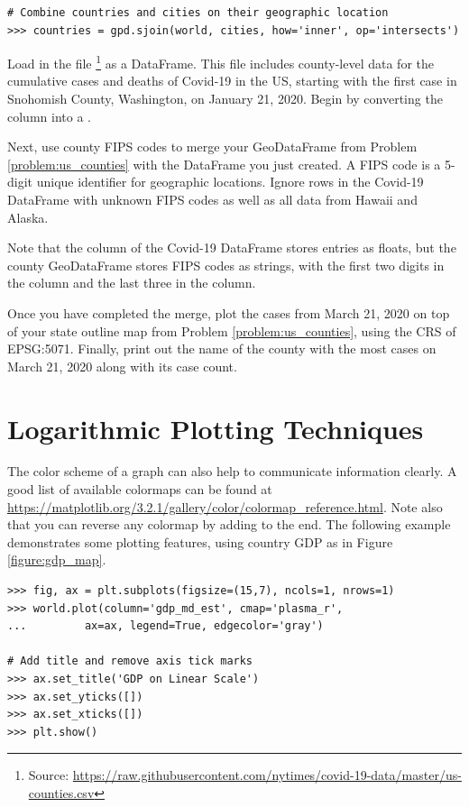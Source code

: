 \begin{lstlisting}
# Combine countries and cities on their geographic location
>>> countries = gpd.sjoin(world, cities, how='inner', op='intersects')
\end{lstlisting}

\begin{problem}
Load in the file \footnote{Source: \url{https://raw.githubusercontent.com/nytimes/covid-19-data/master/us-counties.csv}} as a DataFrame.
This file includes county-level data for the cumulative cases and deaths of Covid-19 in the US, starting with the first case in Snohomish County, Washington, on January 21, 2020.
Begin by converting the  column into a .

Next, use county FIPS codes to merge your GeoDataFrame from Problem \ref{problem:us_counties} with the DataFrame you just created.
A FIPS code is a 5-digit unique identifier for geographic locations.
Ignore rows in the Covid-19 DataFrame with unknown FIPS codes as well as all data from Hawaii and Alaska.

Note that the  column of the Covid-19 DataFrame stores entries as floats, but the county GeoDataFrame stores FIPS codes as strings, with the first two digits in the  column and the last three in the  column.

Once you have completed the merge, plot the cases from March 21, 2020 on top of your state outline map from Problem \ref{problem:us_counties}, using the CRS of EPSG:5071.
Finally, print out the name of the county with the most cases on March 21, 2020 along with its case count.
\label{problem:merge_covid}
\end{problem}

\section*{Logarithmic Plotting Techniques} %

The color scheme of a graph can also help to communicate information clearly.
A good list of available colormaps can be found at \url{https://matplotlib.org/3.2.1/gallery/color/colormap_reference.html}.
Note also that you can reverse any colormap by adding  to the end.
The following example demonstrates some plotting features, using country GDP as in Figure \ref{figure:gdp_map}.

\begin{lstlisting}
>>> fig, ax = plt.subplots(figsize=(15,7), ncols=1, nrows=1)
>>> world.plot(column='gdp_md_est', cmap='plasma_r',
...			ax=ax, legend=True, edgecolor='gray')

# Add title and remove axis tick marks
>>> ax.set_title('GDP on Linear Scale')
>>> ax.set_yticks([])
>>> ax.set_xticks([])
>>> plt.show()
\end{lstlisting}

